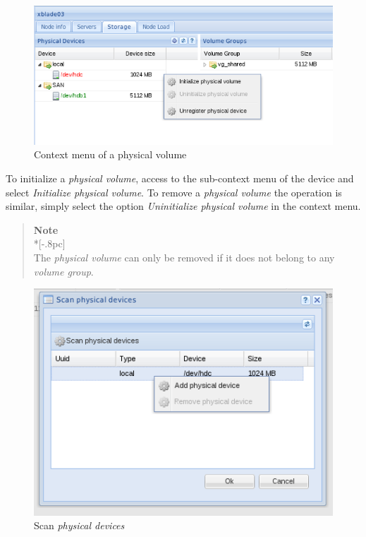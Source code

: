 \begin{figure}[H]
        \begin{center}
        \includegraphics[scale=0.45]{screenshots/node_storage_device_ctx.png}
        \caption{Context menu of a physical volume}
        \label{fig:storage_device_ctx}
        \end{center}
\end{figure}

To initialize a \emph{physical volume}, access to the sub-context menu of the device and select \emph{Initialize physical volume}. To remove a \emph{physical volume} the operation is similar, simply select the option \emph{Uninitialize physical volume} in the context menu.

\begin{quote}
	{\large \bf Note} \\*[-.8pc]
	\underline{\hspace{6in}} \\
    The \emph{physical volume} can only be removed if it does not belong to any \emph{volume group}.
\end{quote}

\begin{figure}[H]
        \begin{center}
        \includegraphics[scale=0.45]{screenshots/node_storage_device_search.png}
        \caption{Scan \emph{physical devices} }
        \label{fig:storage_device_search}
        \end{center}
\end{figure}

